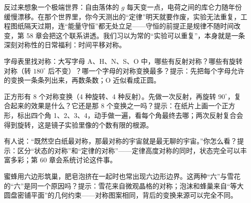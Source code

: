 \begin{thought}[如果定律明天会变]
反过来想象一个极端世界：自由落体的 \(g\) 每天变一点，电荷之间的库仑力随年份缓慢漂移。在那个世界里，你今天测出的“定律”明天就要作废，实验无法重复，工程图纸隔天过期，连“能量守恒”都无处立足——守恒的前提正是规律不随时间改变，第 58 章会把这个联系讲透。我们习以为常的“实验可以重复”，本身就是一条深刻对称性的日常福利：时间平移对称。
\end{thought}

\begin{puzzles}
\item 字母表里找对称：大写字母 A、H、N、S、O 中，哪些有反射对称？哪些有旋转对称（转 \(180^\circ\) 后不变）？哪一个字母的对称变换最多？提示：先把每个字母允许的变换一条条列出来，再数条数；O 近似看成正圆。
\item 正方形有 8 个对称变换（4 种旋转、4 种反射）。先做一次反射，再旋转 \(90^\circ\)，复合起来的效果是什么？它还是那 8 个变换之一吗？提示：在纸片上画一个正方形，标出四个角 1、2、3、4，动手做一遍，看每个角最终去哪；两次反射复合会得到旋转，这是镜子实验里像的个数有限的根源。
\item 有人说：“既然空白纸最对称，那最对称的宇宙就是最无聊的宇宙。”你怎么看？提示：区分“状态的对称”和“定律的对称”——定律高度对称的同时，状态完全可以丰富多彩；第 60 章会系统讨论这件事。
\item 蜜蜂用六边形筑巢，肥皂泡挤在一起时也常出现六边形边界。这两种“六”与雪花的“六”是同一个原因吗？提示：雪花来自微观晶格的对称；泡沫和蜂巢来自“等大圆盘密铺平面”的几何约束——对称图案相同，背后的变换来源可以完全不同。
\end{puzzles}
